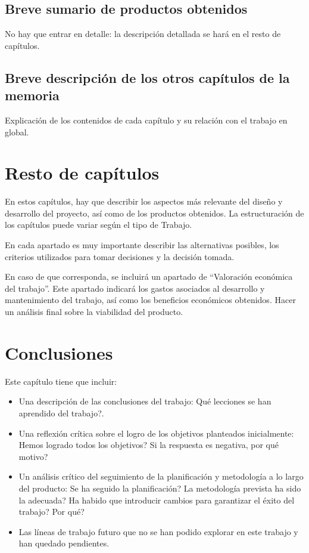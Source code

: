 \documentclass[11pt,a4paper]{article}
\begin{document}
\subsection{Breve sumario de productos obtenidos}
No hay que entrar en detalle: la descripción detallada se hará en el resto de capítulos. 

\subsection{Breve descripción de los otros capítulos de la memoria}
Explicación de los contenidos de cada capítulo y su relación con el trabajo en global.
\newpage 


\section{Resto de capítulos}
En estos capítulos, hay que describir los aspectos más relevante del diseño y desarrollo del proyecto, así como de los productos obtenidos. La estructuración de los capítulos puede variar según el tipo de Trabajo.  

En cada apartado es muy importante describir las alternativas posibles, los criterios utilizados para tomar decisiones y la decisión tomada.

En caso de que corresponda, se incluirá un apartado de “Valoración económica del trabajo”. Este apartado indicará los gastos asociados al desarrollo y mantenimiento del trabajo, así como los beneficios económicos obtenidos. Hacer un análisis final sobre la viabilidad del producto. 
\newpage 


\section{Conclusiones}
Este capítulo tiene que incluir:
\begin{itemize}
\item Una descripción de las conclusiones del trabajo: Qué lecciones se han aprendido del trabajo?.
\item Una reflexión crítica sobre el logro de los objetivos planteados inicialmente: Hemos logrado todos los objetivos? Si la respuesta es negativa, por qué motivo? 
\item Un análisis crítico del seguimiento de la planificación y metodología a lo largo del producto: Se ha seguido la planificación? La metodología prevista ha sido la adecuada? Ha habido que introducir cambios para garantizar el éxito del trabajo? Por qué? 
\item Las líneas de trabajo futuro que no se han podido explorar en este trabajo y han quedado pendientes.
\end{itemize}
\newpage 
\end{document}
